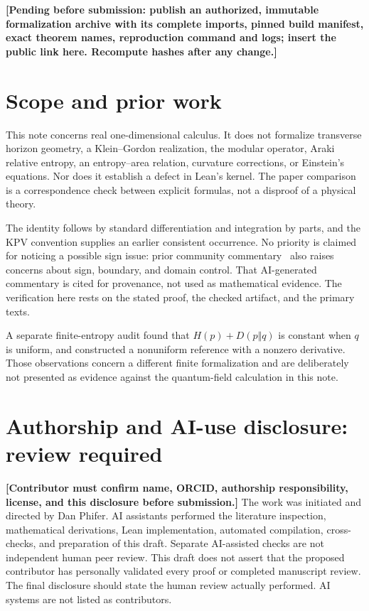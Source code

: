 \documentclass[11pt]{article}
\begin{document}
\textbf{[Pending before submission: publish an authorized, immutable formalization archive with its complete imports, pinned build manifest, exact theorem names, reproduction command and logs; insert the public link here. Recompute hashes after any change.]}

\section{Scope and prior work}
This note concerns real one-dimensional calculus. It does not formalize transverse horizon geometry, a Klein--Gordon realization, the modular operator, Araki relative entropy, an entropy--area relation, curvature corrections, or Einstein's equations. Nor does it establish a defect in Lean's kernel. The paper comparison is a correspondence check between explicit formulas, not a disproof of a physical theory.

The identity follows by standard differentiation and integration by parts, and the KPV convention supplies an earlier consistent occurrence. No priority is claimed for noticing a possible sign issue: prior community commentary~\cite{community} also raises concerns about sign, boundary, and domain control. That AI-generated commentary is cited for provenance, not used as mathematical evidence. The verification here rests on the stated proof, the checked artifact, and the primary texts.

A separate finite-entropy audit found that $H(p)+D(p\Vert q)$ is constant when $q$ is uniform, and constructed a nonuniform reference with a nonzero derivative. Those observations concern a different finite formalization and are deliberately not presented as evidence against the quantum-field calculation in this note.

\section*{Authorship and AI-use disclosure: review required}
\textbf{[Contributor must confirm name, ORCID, authorship responsibility, license, and this disclosure before submission.]}
The work was initiated and directed by Dan Phifer. AI assistants performed the literature inspection, mathematical derivations, Lean implementation, automated compilation, cross-checks, and preparation of this draft. Separate AI-assisted checks are not independent human peer review. This draft does not assert that the proposed contributor has personally validated every proof or completed manuscript review. The final disclosure should state the human review actually performed. AI systems are not listed as contributors.
\end{document}
